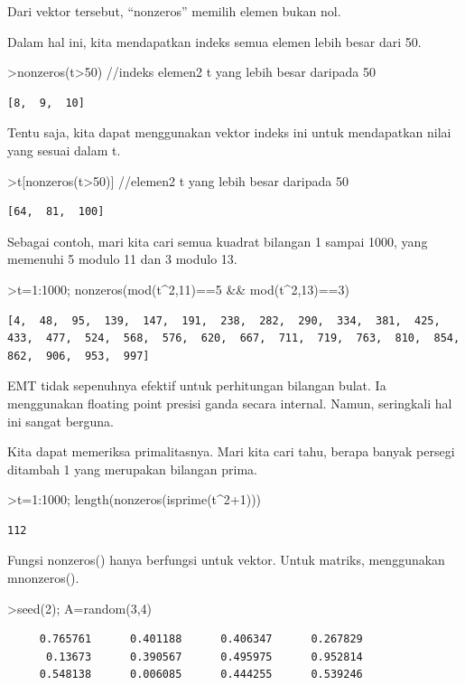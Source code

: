 \documentclass[
]{book}
\begin{document}
Dari vektor tersebut, ``nonzeros'' memilih elemen bukan nol.

Dalam hal ini, kita mendapatkan indeks semua elemen lebih besar dari 50.

\textgreater nonzeros(t\textgreater50) //indeks elemen2 t yang lebih besar daripada 50

\begin{verbatim}
[8,  9,  10]
\end{verbatim}

Tentu saja, kita dapat menggunakan vektor indeks ini untuk mendapatkan nilai yang sesuai dalam t.

\textgreater t{[}nonzeros(t\textgreater50){]} //elemen2 t yang lebih besar daripada 50

\begin{verbatim}
[64,  81,  100]
\end{verbatim}

Sebagai contoh, mari kita cari semua kuadrat bilangan 1 sampai 1000, yang memenuhi 5 modulo 11 dan 3 modulo 13.

\textgreater t=1:1000; nonzeros(mod(t\^{}2,11)==5 \&\& mod(t\^{}2,13)==3)

\begin{verbatim}
[4,  48,  95,  139,  147,  191,  238,  282,  290,  334,  381,  425,
433,  477,  524,  568,  576,  620,  667,  711,  719,  763,  810,  854,
862,  906,  953,  997]
\end{verbatim}

EMT tidak sepenuhnya efektif untuk perhitungan bilangan bulat. Ia menggunakan floating point presisi ganda secara internal. Namun, seringkali hal ini sangat berguna.

Kita dapat memeriksa primalitasnya. Mari kita cari tahu, berapa banyak persegi ditambah 1 yang merupakan bilangan prima.

\textgreater t=1:1000; length(nonzeros(isprime(t\^{}2+1)))

\begin{verbatim}
112
\end{verbatim}

Fungsi nonzeros() hanya berfungsi untuk vektor. Untuk matriks, menggunakan mnonzeros().

\textgreater seed(2); A=random(3,4)

\begin{verbatim}
     0.765761      0.401188      0.406347      0.267829 
      0.13673      0.390567      0.495975      0.952814 
     0.548138      0.006085      0.444255      0.539246 
\end{verbatim}
\end{document}
